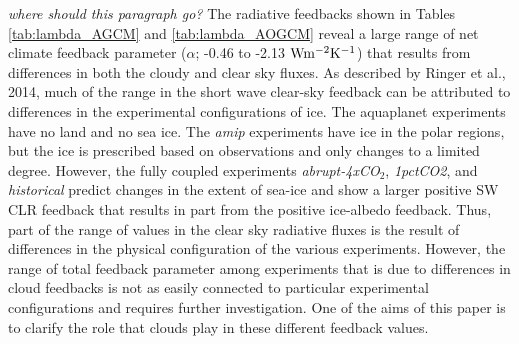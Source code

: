 \documentclass[draft]{agujournal2019}
\begin{document}
\textit{where should this paragraph go?}
The radiative feedbacks shown in Tables \ref{tab:lambda_AGCM} and \ref{tab:lambda_AOGCM} reveal a large range of 
net climate feedback parameter ($\alpha$; -0.46 to -2.13 $\rm{W m^{-2}K^{-1}}$) that results from differences in both the 
cloudy and clear sky fluxes.   
%
As described by Ringer et al., 2014, much of the range in the short wave clear-sky feedback can be attributed to differences 
in the experimental configurations of ice.  The aquaplanet experiments have no land and no sea ice.  
The \textit{amip} experiments have ice in the polar regions, but the ice is prescribed based on observations and 
only changes to a limited degree.  However, the fully coupled experiments \textit{abrupt-4xCO$_2$}, 
\textit{1pctCO2}, and \textit{historical} predict changes in the extent of sea-ice and show a larger positive SW CLR
feedback that results in part from the positive ice-albedo feedback.  
Thus, part of the range of values in the clear sky radiative fluxes is the result of differences in the physical configuration 
of the various experiments.  
However, the range of total feedback parameter among experiments that is due to differences in cloud feedbacks is not as easily connected to particular experimental configurations and requires further investigation.  One of the aims of this paper is to clarify the role that clouds play in 
these different feedback values.  


\end{document}
